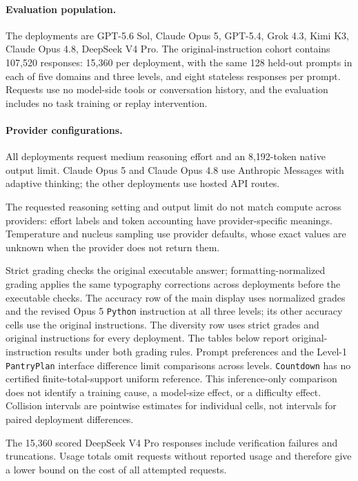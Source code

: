 \paragraph{Evaluation population.}
The deployments are GPT-5.6 Sol, Claude Opus 5, GPT-5.4, Grok 4.3, Kimi K3, Claude Opus 4.8, DeepSeek V4 Pro. The original-instruction cohort contains
107,520 responses: 15,360 per deployment, with the same 128 held-out
prompts in each of five domains and three levels, and eight stateless responses
per prompt. Requests use no model-side tools or conversation history, and
the evaluation includes no task training or replay intervention.

\paragraph{Provider configurations.}
All deployments request medium reasoning effort and an 8,192-token native
output limit. Claude Opus 5 and Claude Opus 4.8 use Anthropic Messages with
adaptive thinking; the other deployments use hosted API routes.

The requested reasoning setting and output limit do not match compute across
providers: effort labels and token accounting have provider-specific meanings.
Temperature and nucleus sampling use provider defaults, whose exact values
are unknown when the provider does not return them.

Strict grading checks the original executable answer; formatting-normalized
grading applies the same typography corrections across deployments before
the executable checks. The accuracy row of the main display uses normalized
grades and the revised Opus 5 \texttt{Python} instruction at all three levels;
its other accuracy cells use the original instructions. The diversity row
uses strict grades and original instructions for every deployment.
The tables below report original-instruction results under both grading rules.
Prompt preferences and the Level-1 \texttt{PantryPlan} interface difference limit
comparisons across levels. \texttt{Countdown} has no certified finite-total-support
uniform reference. This inference-only comparison does not identify a training
cause, a model-size effect, or a difficulty effect. Collision intervals are
pointwise estimates for individual cells, not intervals for paired deployment differences.

The 15,360 scored DeepSeek V4 Pro responses include verification failures
and truncations. Usage totals omit requests without reported usage and
therefore give a lower bound on the cost of all attempted requests.
